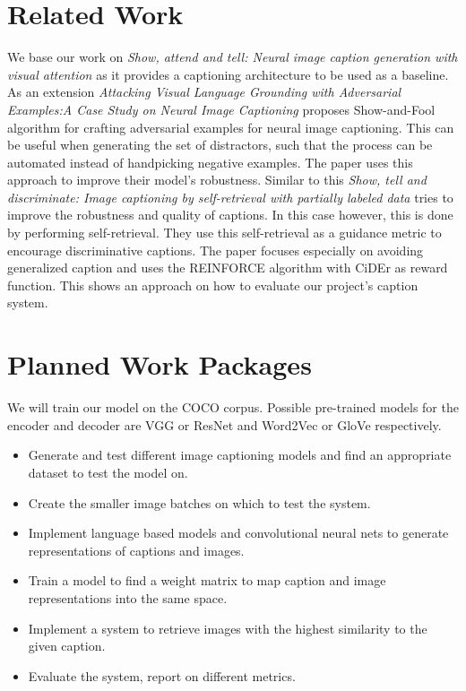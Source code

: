 \documentclass[12pt]{article}
\begin{document}
\section{Related Work}

We base our work on \textit{Show, attend and tell: Neural image caption generation with visual attention} \cite{xu2015show} as it provides a captioning architecture to be used as a baseline.
As an extension \textit{Attacking Visual Language Grounding with Adversarial Examples:A Case Study on Neural Image Captioning} \cite{chen2017attacking} proposes Show-and-Fool algorithm for crafting adversarial examples for neural image captioning. This can be useful when generating the set of distractors, such that the process can be automated instead of handpicking negative examples. The paper uses this approach to improve their model’s robustness.
Similar to this \textit{Show, tell and discriminate: Image captioning by self-retrieval with partially labeled data} \cite{liu2018show}  tries to improve the robustness and quality of captions. In this case however, this is done by performing self-retrieval. They use this self-retrieval as a guidance metric to encourage discriminative captions. The paper focuses especially on avoiding generalized caption and uses the REINFORCE algorithm with CiDEr as reward function. This shows an approach on how to evaluate our project’s caption system.

\section{Planned Work Packages}

We will train our model on the COCO corpus.
Possible pre-trained models for the encoder and decoder are VGG or ResNet and Word2Vec or GloVe respectively.

\begin{itemize}
    \item Generate and test different image captioning models and find an appropriate dataset to test the model on.
    \item Create the smaller image batches on which to test the system.
    \item Implement language based models and convolutional neural nets to generate representations of captions and images.
    \item Train a model to find a weight matrix to map caption and image representations  into the same space.
    \item Implement a system to retrieve images with the highest similarity to the given caption.
    \item Evaluate the system, report on different metrics.
\end{itemize}

\newpage

 

\end{document}
